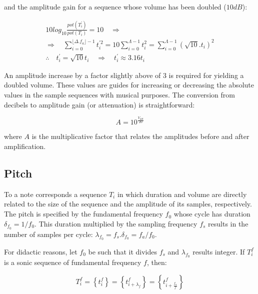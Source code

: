 \noindent and the amplitude gain for a sequence whose volume has been doubled ($10dB$):

\begin{equation}\label{eq:dobraVol}
\begin{split}
10log_{10}\frac{pot(T^{'}_i)}{pot(T_i)} = 10 \quad \Rightarrow \\ \Rightarrow \quad \sum_{i=0}^{\lfloor \Delta.f_a \rfloor -1}t^{'2}_i=10\sum_{i=0}^{\Lambda-1}t_i^2=\sum_{i=0}^{\Lambda-1}(\sqrt{10}.t_i)^2 \\
\therefore \quad t^{'}_i=\sqrt{10}t_i \quad \Rightarrow \quad t^{'}_i \approx 3.16t_i
\end{split}
\end{equation}

An amplitude increase by a factor slightly above of 3 is required for yielding a doubled volume. These values are guides for increasing or decreasing the absolute values in the sample sequences with musical purposes. The conversion from decibels to amplitude gain (or attenuation) is straightforward:

\begin{equation}\label{ampDec}
A = 10^{\frac{V_{dB}}{20}}
\end{equation}

\noindent where $A$ is the multiplicative factor that relates the amplitudes before and after amplification.

\subsection{Pitch}

To a note corresponds a sequence $T_i$ in which duration and volume are directly related to the size of the sequence and the amplitude of its samples, respectively. The pitch is specified by the fundamental frequency $f_0$ whose cycle has duration $\delta_{f_0}=1/f_0$. This duration multiplied by the sampling frequency $f_s$ results in the number of samples per cycle: $\lambda_{f_0}=f_s . \delta_{f_0} =f_a/f_0$.

For didactic reasons, let $f_0$ be such that it divides $f_s$ and $\lambda_{f_0}$ results integer. If $T_i^f$ is a sonic sequence of fundamental frequency $f$, then:

\begin{equation}\label{periodicidade}
     T^f_i=\left\{ t_i^f \right\}=\left\{ t^f_{i+\lambda_{f}}  \right\}= \left\{ t^f_{i+\frac{f_a}{f}} \right\}
\end{equation}

